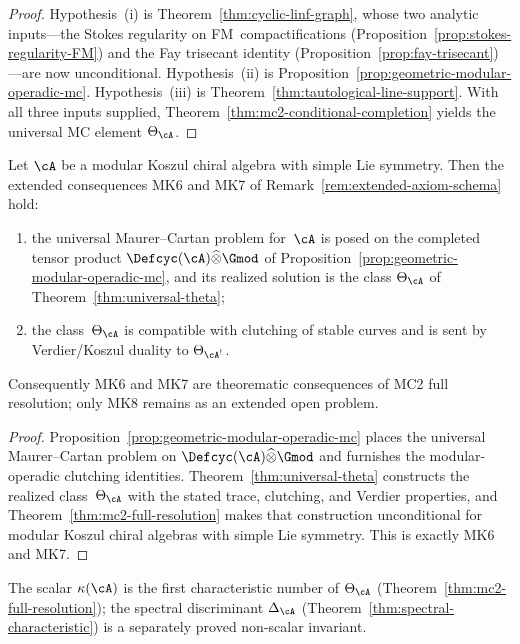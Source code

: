 \begin{proof}
Hypothesis~(i) is Theorem~\ref{thm:cyclic-linf-graph}, whose
two analytic inputs---the Stokes regularity on
FM~compactifications
(Proposition~\ref{prop:stokes-regularity-FM}) and the Fay
trisecant identity
(Proposition~\ref{prop:fay-trisecant})---are now
unconditional.  Hypothesis~(ii) is
Proposition~\ref{prop:geometric-modular-operadic-mc}.
Hypothesis~(iii) is
Theorem~\ref{thm:tautological-line-support}.
With all three inputs supplied,
Theorem~\ref{thm:mc2-conditional-completion} yields the
universal MC element $\Theta_{\cA}$.
\end{proof}

\begin{lemma}
\label{lem:mk67-from-mc2}
Let $\cA$ be a modular Koszul chiral algebra with simple Lie
symmetry.  Then the extended consequences MK6 and MK7 of
Remark~\ref{rem:extended-axiom-schema} hold:
\begin{enumerate}[label=\textup{(\roman*)}]
\item the universal Maurer--Cartan problem for~$\cA$ is posed on the
  completed tensor product
  $\Defcyc(\cA)\widehat{\otimes}\Gmod$ of
  Proposition~\ref{prop:geometric-modular-operadic-mc}, and its
  realized solution is the class
  $\Theta_{\cA}$ of Theorem~\ref{thm:universal-theta};
\item the class~$\Theta_{\cA}$ is compatible with clutching of stable
  curves and is sent by Verdier/Koszul duality to
  $\Theta_{\cA^!}$.
\end{enumerate}
Consequently MK6 and MK7 are theorematic consequences of MC2 full
resolution; only MK8 remains as an extended open problem.
\end{lemma}

\begin{proof}
Proposition~\ref{prop:geometric-modular-operadic-mc} places the
universal Maurer--Cartan problem on
$\Defcyc(\cA)\widehat{\otimes}\Gmod$ and furnishes the
modular-operadic clutching identities.  Theorem~\ref{thm:universal-theta}
constructs the realized class~$\Theta_{\cA}$ with the stated trace,
clutching, and Verdier properties, and
Theorem~\ref{thm:mc2-full-resolution} makes that construction
unconditional for modular Koszul chiral algebras with simple Lie
symmetry.  This is exactly MK6 and MK7.
\end{proof}

\begin{remark}
\label{rem:kappa-theta-relation}
The scalar $\kappa(\cA)$ is the first characteristic number of
$\Theta_{\cA}$ (Theorem~\ref{thm:mc2-full-resolution}); the
spectral discriminant $\Delta_{\cA}$
(Theorem~\ref{thm:spectral-characteristic}) is a separately proved
non-scalar invariant.
\end{remark}

